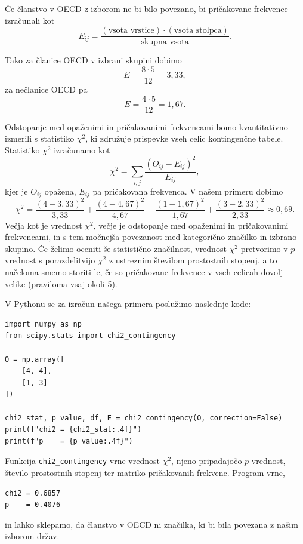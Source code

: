 Če članstvo v OECD z izborom ne bi bilo povezano, bi pričakovane frekvence izračunali kot
\[
E_{ij}=\frac{(\text{vsota vrstice})\cdot(\text{vsota stolpca})}{\text{skupna vsota}}.
\]

Tako za članice OECD v izbrani skupini dobimo
\[
E=\frac{8\cdot 5}{12}=3{,}33,
\]
za nečlanice OECD pa
\[
E=\frac{4\cdot 5}{12}=1{,}67.
\]

Odstopanje med opaženimi in pričakovanimi frekvencami bomo kvantitativno izmerili s statistiko \(\chi^2\), ki združuje prispevke vseh celic kontingenčne tabele. Statistiko \(\chi^2\) 
%
%
izračunamo kot
\[
\chi^2=\sum_{i,j}\frac{(O_{ij}-E_{ij})^2}{E_{ij}},
\]
kjer je \(O_{ij}\) opažena, \(E_{ij}\) pa pričakovana frekvenca. V našem primeru dobimo
\[
\chi^2 = \frac{(4-3{,}33)^2}{3{,}33}
       + \frac{(4-4{,}67)^2}{4{,}67}
       + \frac{(1-1{,}67)^2}{1{,}67}
       + \frac{(3-2{,}33)^2}{2{,}33}
\approx 0{,}69.
\]
Večja kot je vrednost \(\chi^2\), večje je odstopanje med opaženimi in pričakovanimi frekvencami, in s tem močnejša povezanost med kategorično značilko in izbrano skupino. Če želimo oceniti še statistično značilnost, vrednost \(\chi^2\) pretvorimo v \(p\)-vrednost s porazdelitvijo \(\chi^2\) z ustreznim številom prostostnih stopenj, a to načeloma smemo storiti le, če so pričakovane frekvence v vseh celicah dovolj velike (praviloma vsaj okoli 5).

V Pythonu se za izračun našega primera poslužimo naslednje kode:
\vspace*{3mm}
\begin{lstlisting}
import numpy as np
from scipy.stats import chi2_contingency

O = np.array([
    [4, 4],
    [1, 3]
])

chi2_stat, p_value, df, E = chi2_contingency(O, correction=False)
print(f"chi2 = {chi2_stat:.4f}")
print(f"p    = {p_value:.4f}")
\end{lstlisting}
%
Funkcija \texttt{chi2\_contingency} vrne vrednost \(\chi^2\), njeno pripadajočo \(p\)-vrednost, število prostostnih stopenj ter matriko pričakovanih frekvenc. Program vrne,
\vspace*{3mm}
\begin{lstlisting}
chi2 = 0.6857
p    = 0.4076
\end{lstlisting}
in lahko sklepamo, da članstvo v OECD ni značilka, ki bi bila povezana z našim izborom držav.

